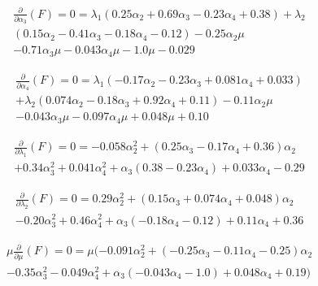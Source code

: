 \documentclass[twocolumn,10pt]{asme2ej}
\begin{document}
\begin{equation}
\begin{array}{c}
\frac{\partial}{\partial \alpha_3}(F) = 0 = {\lambda_1} (0.25 {\alpha_2}+0.69 {\alpha_3}-0.23 {\alpha_4}+0.38)+{\lambda_2}\\ (0.15 {\alpha_2}-0.41 {\alpha_3}-0.18 {\alpha_4}-0.12)-0.25 {\alpha_2} \mu\\ -0.71 {\alpha_3} \mu -0.043 {\alpha_4} \mu -1.0 \mu -0.029
\end{array}
\end{equation}

\begin{equation}
\begin{array}{c}
\frac{\partial}{\partial \alpha_4}(F) = 0 = {\lambda_1} (-0.17 {\alpha_2}-0.23 {\alpha_3}+0.081 {\alpha_4}+0.033)\\+{\lambda_2} (0.074 {\alpha_2}-0.18 {\alpha_3}+0.92 {\alpha_4}+0.11)-0.11 {\alpha_2} \mu\\ -0.043 {\alpha_3} \mu -0.097 {\alpha_4} \mu +0.048 \mu +0.10
\end{array}
\end{equation}

\begin{equation}
\begin{array}{c}
\frac{\partial}{\partial \lambda_1}(F) = 0 =-0.058 \alpha_2^2+(0.25 \alpha_3-0.17 \alpha_4+0.36) \alpha_2\\+0.34 \alpha_3^2+0.041 \alpha_4^2+\alpha_3 (0.38-0.23 \alpha_4)+0.033 \alpha_4-0.29
\end{array}
\end{equation}

\begin{equation}
\begin{array}{c}
\frac{\partial}{\partial \lambda_2}(F) = 0 =0.29 \alpha_2^2+(0.15 \alpha_3+0.074 \alpha_4+0.048) \alpha_2\\-0.20 \alpha_3^2+0.46 \alpha_4^2+\alpha_3 (-0.18 \alpha_4-0.12)+0.11 \alpha_4+0.36
\end{array}
\end{equation}

\begin{equation}
\begin{array}{c}
\mu\frac{\partial}{\partial \mu}(F) = 0 =\mu(-0.091 \alpha_2^2+(-0.25 \alpha_3-0.11 \alpha_4-0.25) \alpha_2\\-0.35 \alpha_3^2-0.049 \alpha_4^2+\alpha_3 (-0.043 \alpha_4-1.0)+0.048 \alpha_4+0.19)
\end{array}
\end{equation}
\end{document}
